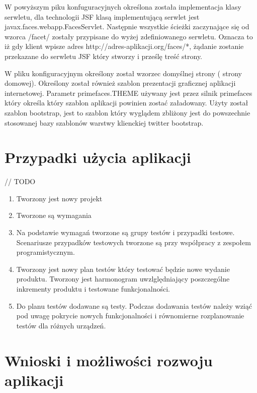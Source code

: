 W powyższym piku konfuguracyjnych określona została implementacja klasy serwletu, dla technologii JSF klasą implementującą serwlet jest javax.faces.webapp.FacesServlet. Następnie wszystkie ścieżki zaczynające się od wzorca /facet/ zostały przypisane do wyżej zdefiniowanego serwletu. Oznacza to iż gdy klient wpisze adres http://adres-aplikacji.org/faces/*, żądanie zostanie przekazane do serwletu JSF który stworzy i prześlę treść strony.

W pliku konfiguracyjnym określony został wzorzec domyślnej strony ( strony domowej). Określony został również szablon prezentacji graficznej aplikacji internetowej. Parametr primefaces.THEME używany jest przez silnik primefaces który określa który szablon aplikacji powinien zostać załadowany. Użyty został szablon bootstrap, jest to szablon który wyglądem zbliżony jest do powszechnie stosowanej bazy szablonów warstwy klienckiej twitter bootstrap. 


\chapter{Przypadki użycia aplikacji}
// TODO 
\begin{enumerate}
  \item Tworzony jest nowy projekt
  \item Tworzone są wymagania
  \item Na podstawie wymagań tworzone są grupy testów i przypadki testowe. Scenariusze przypadków testowych tworzone są przy współpracy z zespołem programistycznym.
  \item Tworzony jest nowy plan testów który testować będzie nowe wydanie produktu. Tworzony jest harmonogram uwzlględniający poszczególne inkrementy produktu i testowane funkcjonalności.
  \item Do planu testów dodawane są testy. Podczas dodawania testów należy wziąć pod uwagę pokrycie nowych funkcjonalności i równomierne rozplanowanie testów dla różnych urządzeń.

\end{enumerate}

\chapter{Wnioski i możliwości rozwoju aplikacji}
